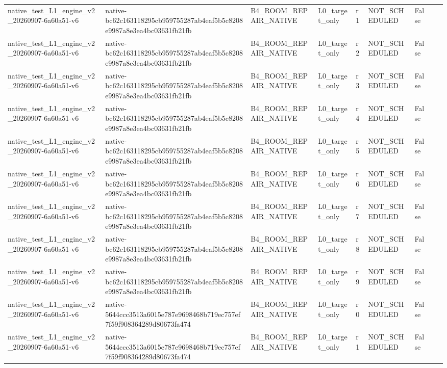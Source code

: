 \begin{tabular}{lllllllll}
native\_test\_L1\_engine\_v2\_20260907-6a60a51-v6 & native-bc62c163118295cb959755287ab4eaf5b5c8208e9987a8e3ea4bc03631fb21fb & B4\_ROOM\_REPAIR\_NATIVE & L0\_target\_only & r1 & NOT\_SCHEDULED & False &  &  \\
native\_test\_L1\_engine\_v2\_20260907-6a60a51-v6 & native-bc62c163118295cb959755287ab4eaf5b5c8208e9987a8e3ea4bc03631fb21fb & B4\_ROOM\_REPAIR\_NATIVE & L0\_target\_only & r2 & NOT\_SCHEDULED & False &  &  \\
native\_test\_L1\_engine\_v2\_20260907-6a60a51-v6 & native-bc62c163118295cb959755287ab4eaf5b5c8208e9987a8e3ea4bc03631fb21fb & B4\_ROOM\_REPAIR\_NATIVE & L0\_target\_only & r3 & NOT\_SCHEDULED & False &  &  \\
native\_test\_L1\_engine\_v2\_20260907-6a60a51-v6 & native-bc62c163118295cb959755287ab4eaf5b5c8208e9987a8e3ea4bc03631fb21fb & B4\_ROOM\_REPAIR\_NATIVE & L0\_target\_only & r4 & NOT\_SCHEDULED & False &  &  \\
native\_test\_L1\_engine\_v2\_20260907-6a60a51-v6 & native-bc62c163118295cb959755287ab4eaf5b5c8208e9987a8e3ea4bc03631fb21fb & B4\_ROOM\_REPAIR\_NATIVE & L0\_target\_only & r5 & NOT\_SCHEDULED & False &  &  \\
native\_test\_L1\_engine\_v2\_20260907-6a60a51-v6 & native-bc62c163118295cb959755287ab4eaf5b5c8208e9987a8e3ea4bc03631fb21fb & B4\_ROOM\_REPAIR\_NATIVE & L0\_target\_only & r6 & NOT\_SCHEDULED & False &  &  \\
native\_test\_L1\_engine\_v2\_20260907-6a60a51-v6 & native-bc62c163118295cb959755287ab4eaf5b5c8208e9987a8e3ea4bc03631fb21fb & B4\_ROOM\_REPAIR\_NATIVE & L0\_target\_only & r7 & NOT\_SCHEDULED & False &  &  \\
native\_test\_L1\_engine\_v2\_20260907-6a60a51-v6 & native-bc62c163118295cb959755287ab4eaf5b5c8208e9987a8e3ea4bc03631fb21fb & B4\_ROOM\_REPAIR\_NATIVE & L0\_target\_only & r8 & NOT\_SCHEDULED & False &  &  \\
native\_test\_L1\_engine\_v2\_20260907-6a60a51-v6 & native-bc62c163118295cb959755287ab4eaf5b5c8208e9987a8e3ea4bc03631fb21fb & B4\_ROOM\_REPAIR\_NATIVE & L0\_target\_only & r9 & NOT\_SCHEDULED & False &  &  \\
native\_test\_L1\_engine\_v2\_20260907-6a60a51-v6 & native-5644ccc3513a6015e787e9698468b719ec757ef7f59f908364289d80673fa474 & B4\_ROOM\_REPAIR\_NATIVE & L0\_target\_only & r0 & NOT\_SCHEDULED & False &  &  \\
native\_test\_L1\_engine\_v2\_20260907-6a60a51-v6 & native-5644ccc3513a6015e787e9698468b719ec757ef7f59f908364289d80673fa474 & B4\_ROOM\_REPAIR\_NATIVE & L0\_target\_only & r1 & NOT\_SCHEDULED & False &  &  \\

\end{tabular}
